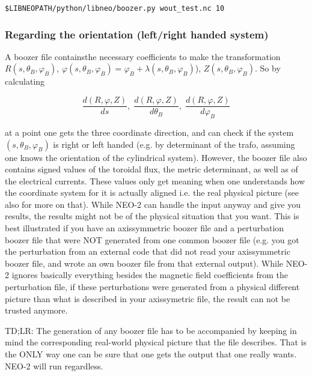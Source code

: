 \documentclass{article}
\newcommand{\vv}[1]{\texttt{\detokenize{#1}}}
\begin{document}
\begin{verbatim}
$LIBNEOPATH/python/libneo/boozer.py wout_test.nc 10
\end{verbatim}

\subsubsection{Regarding the orientation (left/right handed system)}
A boozer file containsthe necessary coefficients to make the transformation 
$R(s,\theta_B,\varphi_B)$, $\varphi(s,\theta_B,\varphi_B)= \varphi_B + \lambda(s,\theta_B,\varphi_B)$), $Z(s,\theta_B,\varphi_B)$. So by calculating

\begin{equation*}
	\frac{d(R,\varphi,Z)}{ds},\; \frac{d(R,\varphi,Z)}{d\theta_B},\; \frac{d(R,\varphi,Z)}{d\varphi_B}
\end{equation*}

at a point one gets the three coordinate direction, and can check if the 
system $(s,\theta_B,\varphi_B)$ is right or left handed (e.g. by determinant 
of the trafo, assuming one knows the orientation of the cylindrical system). 
However, the boozer file also contains signed values of the toroidal flux, 
the metric determinant, as well as of the electrical currents. These values 
only get meaning when one understands how the coordinate system for it is 
actually aligned i.e. the real physical picture (see also \vv{https://gitlab.tugraz.at/plasma/info} 
for more on that). While NEO-2 can handle the input anyway and give you 
results, the results might not be of the physical situation that you want. 
This is best illustrated if you have an axissymmetric boozer file and a 
perturbation boozer file that were NOT generated from one common boozer 
file (e.g. you got the perturbation from an external code that did not 
read your axissymmetric boozer file, and wrote an own boozer file from 
that external output). While NEO-2 ignores basically everything besides 
the magnetic field coefficients from the perturbation file, if these 
perturbations were generated from a physical different picture than 
what is described in your axissymetric file, the result can not be trusted anymore.

TD;LR: The generation of any boozer file has to be accompanied by keeping in mind the 
corresponding real-world physical picture that the file describes. That is the ONLY way one can be
sure that one gets the output that one really wants. NEO-2 will run regardless.

\end{document}
